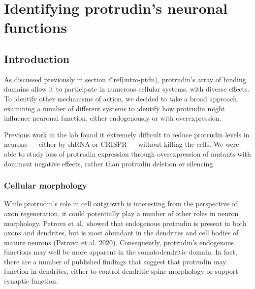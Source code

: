 \documentclass[
]{article}
\author{}
\date{\vspace{-2.5em}}
\begin{document}
\hypertarget{identifying-protrudins-neuronal-functions}{%
\section{Identifying protrudin's neuronal
functions}\label{identifying-protrudins-neuronal-functions}}


\hypertarget{introduction}{%
\subsection{Introduction}\label{introduction}}

As discussed previously in section @ref(intro-ptdn), protrudin's array
of binding domains allow it to participate in numerous cellular systems,
with diverse effects. To identify other mechanisms of action, we decided
to take a broad approach, examining a number of different systems to
identify how protrudin might influence neuronal function, either
endogenously or with overexpression.

Previous work in the lab found it extremely difficult to reduce
protrudin levels in neurons --- either by shRNA or CRISPR --- without
killing the cells. We were able to study loss of protrudin expression
through overexpression of mutants with dominant negative effects, rather
than protrudin deletion or silencing.

\hypertarget{cellular-morphology}{%
\subsubsection{Cellular morphology}\label{cellular-morphology}}

While protrudin's role in cell outgrowth is interesting from the
perspective of axon regeneration, it could potentially play a number of
other roles in neuron morphology. Petrova et al.~showed that endogenous
protrudin is present in both axons and dendrites, but is most abundant
in the dendrites and cell bodies of mature neurons (Petrova et al.
2020). Consequently, protrudin's endogenous functions may well be more
apparent in the somatodendritic domain. In fact, there are a number of
published findings that suggest that protrudin may function in
dendrites, either to control dendritic spine morphology or support
synaptic function.
\end{document}
